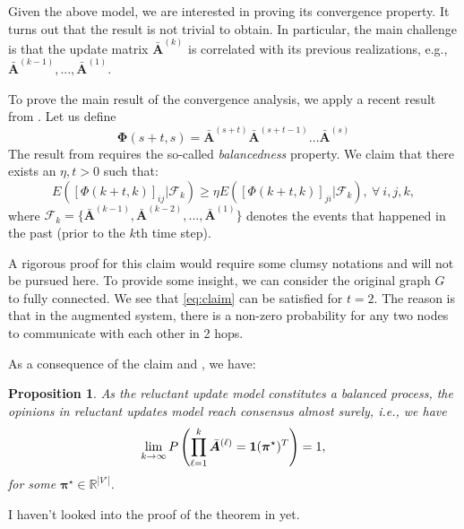 \documentclass[letter]{article}
\newtheorem{prop}{Proposition}
\theoremstyle{remark}
\begin{document}
Given the above model, we are interested in proving its convergence property. It turns out that the result is not trivial to obtain. In particular, the main challenge is that the update matrix $\bar{\bm A}^{(k)}$ is correlated with its previous realizations, e.g., $\bar{\bm A}^{(k-1)}, ..., \bar{\bm A}^{(1)}$. 

To prove the main result of the convergence analysis, we apply a recent result from \cite{}. Let us define 
\[
\bm{\Phi} (s+t,s) = \bar{\bm A}^{(s+t)}  \bar{\bm A}^{(s+t-1)} \ldots  \bar{\bm A}^{(s)}
\]
The result from \cite{} requires the so-called \emph{balancedness} property. We claim that there exists an $\eta, t > 0$ such that:
\begin{equation} \label{eq:claim}
E \left( [\Phi (k+t,k)]_{ij} | \mathcal{F}_{k} \right) \geq \eta E \left( [\Phi (k+t,k)]_{ji} | \mathcal{F}_{k} \right),~\forall~i,j,k,
\end{equation}
where $ \mathcal{F}_{k}  = \{  \bar{\bm A}^{(k-1)},  \bar{\bm A}^{(k-2)}, ...,  \bar{\bm A}^{(1)} \}$ denotes the events that happened in the past (prior to the $k$th time step). 

A rigorous proof for this claim would require some clumsy notations and will not be pursued here. To provide some insight, we can consider the original graph $G$ to fully connected. We see that \eqref{eq:claim} can be satisfied for $t = 2$. The reason is that in the augmented system, there is a non-zero probability for any two nodes to communicate with each other in 2 hops. 

As a consequence of the claim and \cite{}, we have:
\begin{prop}
As the reluctant update model constitutes a balanced process, the opinions in reluctant updates model reach consensus almost surely, i.e., we have
\begin{equation} \label{eq:propo}
\lim_{k \rightarrow \infty} P \left( \prod_{\ell=1}^{k} \bar{\bm A}^{(\ell)} = {\bf 1} ({\bm \pi}^\star)^T \right) = 1,
\end{equation}
for some ${\bm \pi}^\star \in \mathbb{R}^{|V'|}$.
\end{prop}

{\color{red} I haven't looked into the proof of the theorem in \cite{} yet.} 
\end{document}
